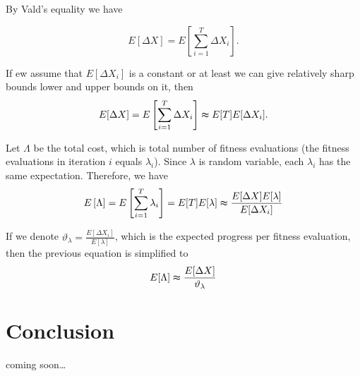 \documentclass[12pt, a4paper]{article}
\theoremstyle{remark}
\newcommand{\cm}{coming soon\dots}
\begin{document}
By Vald's equality we have

\[
    E[\Delta X] = E\left[\sum_{i = 1}^{T} \Delta X_i\right].
\]

If ew assume that $E[\Delta X_i]$ is a constant or at least we can give relatively sharp bounds lower and upper bounds on it, then
\[
    E[\Delta X] = E\left[\sum_{i = 1}^{T} \Delta X_i\right] \thickapprox E[T] E[\Delta X_i].
\]

Let $\Lambda$ be the total cost, which is total number of fitness evaluations (the fitness evaluations in iteration $i$ equals $\lambda_i$). Since $\lambda$ is random variable, each $\lambda_i$ has the same expectation. Therefore, we have
\[
    E\left[\Lambda\right] = E\left[\sum_{i = 1}^{T} \lambda_i\right] = E[T] E[\lambda] \thickapprox \frac{E[\Delta X] E[\lambda]}{E[\Delta X_i]}
\]

If we denote $\vartheta_\lambda = \frac{E[\Delta X_i]}{E[\lambda]}$, which is the expected progress per fitness evaluation, then the previous equation is simplified to
\[
    E[\Lambda] \thickapprox \frac{E[\Delta X]}{\vartheta_\lambda}
\]

\section{Conclusion}
\cm
\end{document}
